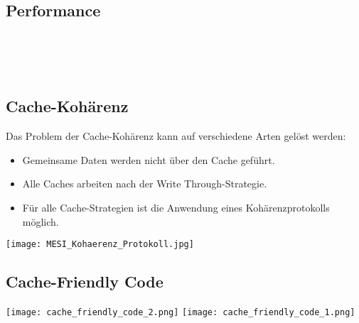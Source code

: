 \subsection{Performance}



\\
\\
\\

\subsection{Cache-Kohärenz}

Das Problem der Cache-Kohärenz kann auf verschiedene Arten gelöst werden:

\begin{itemize}
    \itemsep-.5em 
    \item Gemeinsame Daten werden nicht über den Cache geführt.
    \item Alle Caches arbeiten nach der Write Through-Strategie.
    \item Für alle Cache-Strategien ist die Anwendung eines Kohärenzprotokolls möglich.
\end{itemize}

\texttt{[image: MESI\_Kohaerenz\_Protokoll.jpg]}


\subsection{Cache-Friendly Code}

\texttt{[image: cache\_friendly\_code\_2.png]}
\texttt{[image: cache\_friendly\_code\_1.png]}